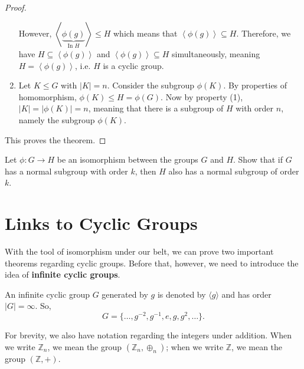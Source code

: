 \begin{proof}
\begin{enumerate}
        However, $\left\langle \underbrace{\phi(g)}_{\text{In }H} \right\rangle \leq H$ which means that $\left\langle \phi(g) \right\rangle \subseteq H$. Therefore, we have $H \subseteq \left\langle \phi(g) \right \rangle$ and $\left\langle \phi(g) \right\rangle \subseteq H$ simultaneously, meaning $H = \left\langle \phi(g) \right\rangle$, i.e. $H$ is a cyclic group.

        

        \item Let $K \leq G$ with $|K| = n$. Consider the subgroup $\phi(K)$. By properties of homomorphism, $\phi(K) \leq H = \phi(G)$. Now by property (1), $|K| = |\phi(K)| = n$, meaning that there is a subgroup of $H$ with order $n$, namely the subgroup $\phi(K)$.
    \end{enumerate}

    This proves the theorem.
\end{proof}

\begin{exercise}
    Let $\phi: G \to H$ be an isomorphism between the groups $G$ and $H$. Show that if $G$ has a normal subgroup with order $k$, then $H$ also has a normal subgroup of order $k$.
\end{exercise}

\section{Links to Cyclic Groups}
With the tool of isomorphism under our belt, we can prove two important theorems regarding cyclic groups. Before that, however, we need to introduce the idea of \textbf{infinite cyclic groups}.
\begin{definition}
    An infinite cyclic group $G$ generated by $g$ is denoted by $\langle g \rangle$ and has order $|G| = \infty$. So,
    \[
        G = \{\dots, g^{-2}, g^{-1}, e, g, g^2, \dots\}.
    \]
\end{definition}

For brevity, we also have notation regarding the integers under addition. When we write $\mathbb{Z}_n$, we mean the group $(\mathbb{Z}_n, \oplus_n)$; when we write $\mathbb{Z}$, we mean the group $(\mathbb{Z}, +)$.

\newpage

